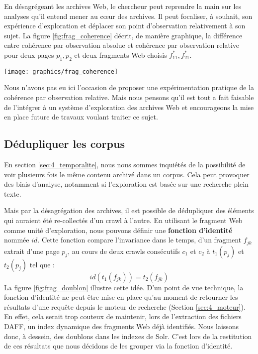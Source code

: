 \documentclass[symmetric,justified,marginals=raggedouter]{tufte-book}
\begin{document}
\noindent En désagrégeant les archives Web, le chercheur peut reprendre la main sur les analyses qu'il entend mener au cœur des archives. Il peut focaliser, à souhait, son expérience d'explo\-ration et déplacer son point d'observation relativement à son sujet. La figure \ref{fig:frag_coherence} décrit, de manière graphique, la différence entre cohérence par observation absolue et cohérence par observation relative pour deux pages $p_1, p_2$ et deux fragments Web choisis $f^*_{11}, f^*_{21}$. 

\begin{figure*}%
  \texttt{[image: graphics/frag\_coherence]}
  \caption{Cohérence par observation absolue et cohérence par observation relative}
  \label{fig:frag_coherence}
\end{figure*}

\noindent Nous n'avons pas eu ici l'occasion de proposer une expérimentation pratique de la cohérence par observation relative. Mais nous pensons qu'il est tout a fait faisable de l'intégrer à un système d'exploration des archives Web et encourageons la mise en place future de travaux voulant traiter ce sujet.  

\subsection{Dédupliquer les corpus}

\noindent En section \ref{sec:4_temporalite}, nous nous sommes inquiétés de la possibilité de voir plusieurs fois le même contenu archivé dans un corpus. Cela peut provoquer des biais d'analyse, notamment si l'exploration est basée sur une recherche plein texte. 

Mais par la désagrégation des archives, il est possible de dédupliquer des éléments qui auraient été re-collectés d'un crawl à l'autre. En utilisant le fragment Web comme unité d'exploration, nous pouvons définir une \textbf{fonction d'identité} nommée $id$. Cette fonction compare l'invariance dans le temps, d'un fragment $f_{jk}$ extrait d'une page $p_j$, au cours de deux crawls consécutifs $c_1$ et $c_2$ à $t_1(p_j)$ et $t_2(p_j)$ tel que :    
\[
	id(t_1(f_{jk})) = t_2(f_{jk})
\]
\noindent La figure \ref{fig:frag_doublon} illustre cette idée. D'un point de vue technique, la fonction d'identité ne peut être mise en place qu'au moment de retourner les résultats d'une requête depuis le moteur de recherche (Section \ref{sec:4_moteur}). En effet, cela serait trop couteux de maintenir, lors de l'extraction des fichiers DAFF, un index dynamique des fragments Web déjà identifiés. Nous laissons donc, à dessein, des doublons dans les indexes de Solr.  C'est lors de la restitution de ces résultats que nous décidons de les grouper via la fonction d'identité.  
\end{document}
